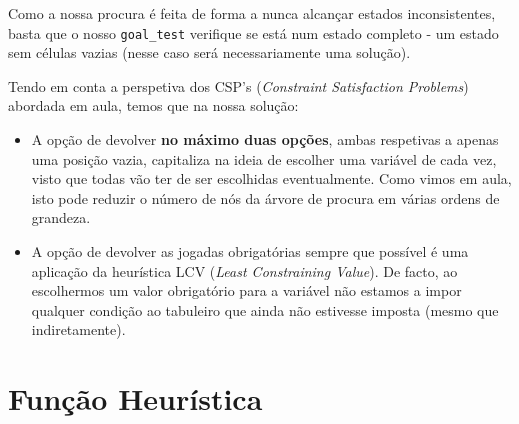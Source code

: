 \documentclass[12pt,a4paper]{article}
\begin{document}
Como a nossa procura é feita de forma a nunca alcançar estados inconsistentes, basta que o nosso \texttt{goal\_test} verifique se está num estado completo - um estado sem células vazias (nesse caso será necessariamente uma solução).

Tendo em conta a perspetiva dos CSP's (\textit{Constraint Satisfaction Problems}) abordada em aula, temos que na nossa solução:
\begin{itemize}
      \item A opção de devolver \textbf{no máximo duas opções}, ambas respetivas a apenas uma posição vazia, capitaliza na ideia de escolher uma variável de cada vez, visto que todas vão ter de ser escolhidas eventualmente.
        Como vimos em aula, isto pode reduzir o número de nós da árvore de procura em várias ordens de grandeza.
      \item A opção de devolver as jogadas obrigatórias sempre que possível é uma aplicação da heurística LCV (\textit{Least Constraining Value}).
        De facto, ao escolhermos um valor obrigatório para a variável não estamos a impor qualquer condição ao tabuleiro que ainda não estivesse imposta (mesmo que indiretamente).
\end{itemize}

\section*{Função Heurística}
\end{document}
